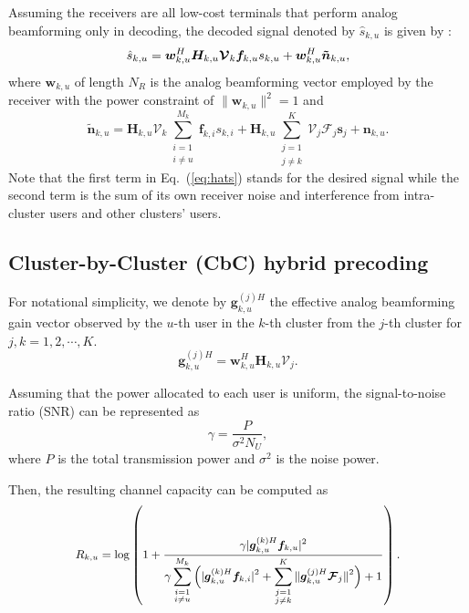 \documentclass[conference]{IEEEtran}
\begin{document}
{Assuming the receivers are all low-cost terminals that perform analog beamforming only in decoding, the decoded signal denoted by $\hat{s}_{k,u}$ is given by :
\begin{equation}{\label{eq:hats}}
\hat{s}_{k,u} = \bm{w}_{k,u}^H \bm{H}_{k,u} \bm{\mathcal{V}}_k \bm{f}_{k,u} s_{k,u} + \bm{w}_{k,u}^H \bm{\tilde{n}}_{k,u},
\end{equation}
where ${\bm w}_{k,u}$ of length $N_R$ is the analog beamforming vector employed by the receiver with the power constraint of $\|\bm{w}_{k,u}\|^2=1$ and
\begin{equation}\label{Eq:ntilde}
\bm{\tilde{n}}_{k,u}=\bm{H}_{k,u} \bm{\mathcal{V}}_k\sum_{\substack{i=1 \\ i\neq u}}^{M_k}\bm{f}_{k,i}s_{k,i} + \bm{H}_{k,u}\sum_{\substack{j=1\\j\neq k}}^{K}\bm{\mathcal{V}}_j\bm{\mathcal{F}}_j\mathbf{s}_j+  \bm{n}_{k,u}.
\end{equation}
Note that the first term in Eq.~(\ref{eq:hats}) stands for the desired signal while the second term is the sum of its own receiver noise and interference from intra-cluster users and other clusters' users.

\subsection{Cluster-by-Cluster (CbC) hybrid precoding}
For notational simplicity, we denote by ${\bm{g}}^{(j)H}_{k,u}$ the effective analog beamforming gain vector observed by the $u$-th user in the $k$-th cluster from the $j$-th cluster for $j,k=1,2,\cdots,K$.
\begin{equation}\label{eq:def}
{\bm{g}}^{(j)H}_{k,u} = \bm{w}^H_{k,u} \bm{H}_{k,u} \bm{\mathcal{V}}_{j}.
\end{equation}

Assuming that the power allocated to each user is uniform, the signal-to-noise ratio (SNR) can be represented as
\begin{equation}
\gamma = \frac{P}{\sigma^2N_U},\label{eq:gamma}
\end{equation}
where $P$ is the total transmission power and $\sigma^2$ is the noise power.

Then, the resulting channel capacity can be computed as
\begin{equation}\small\label{eq:convenR}
R_{k,u} = \log\left(1+\frac{\gamma|{\bm{g}}_{k,u}^{(k)H} \bm{f}_{k,u}|^2}{\gamma\displaystyle\sum_{\substack{i=1 \\ i\neq u}}^{M_k}\Big(|{\bm{g}}_{k,u}^{(k)H}\bm{f}_{k,i}|^2+\displaystyle\sum_{\substack{j=1\\j\neq k}}^{K}\|\bm{g}_{k,u}^{(j)H}\bm{\mathcal{F}}_j\|^2\Big)+1}\right).
\end{equation}

}
\end{document}
